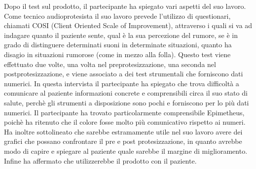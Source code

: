 Dopo il test sul prodotto, il partecipante ha spiegato vari aspetti del suo lavoro. Come tecnico audioprotesista il suo lavoro prevede l'utilizzo di questionari, chiamati COSI (Client Oriented Scale of Improvement), attraverso i quali si va ad indagare quanto il paziente sente, qual è la sua percezione del rumore, se è in grado di distinguere determinati suoni in determinate situazioni, quanto ha disagio in situazioni rumorose (come in mezzo alla folla). Questo test viene effettuato due volte, una volta nel preprotesizzazione, una seconda nel postprotesizzazione, e viene associato a dei test strumentali che forniscono dati numerici. In questa intervista il partecipante ha spiegato che trova difficoltà a comunicare al paziente informazioni concrete e comprensibili circa il suo stato di salute, perchè gli strumenti a disposizione sono pochi e forniscono per lo più dati numerici. Il partecipante ha trovato particolarmente comprensibile Epimetheus, poichè ha ritenuto che il colore fosse molto più comunicativo rispetto ai numeri. Ha inoltre sottolineato che sarebbe estramamente utile nel suo lavoro avere dei grafici che possano confrontare il pre e post protesizzazione, in quanto avrebbe modo di capire e spiegare al paziente quale sarebbe il margine di miglioramento.\\ Infine ha affermato che utilizzerebbe il prodotto con il paziente. 

